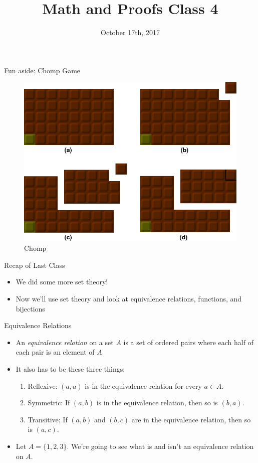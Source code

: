 \documentclass{beamer}
\begin{document}
\title[Math and Proofs]{Math and Proofs Class 4}
\date{October 17th, 2017}

\begin{frame}[plain]
\titlepage
\end{frame}

\begin{frame}{Fun aside: Chomp Game}
\begin{figure}
\includegraphics[scale=0.5]{Chomp.png}
\caption{Chomp}
\end{figure}
\end{frame}

\begin{frame}{Recap of Last Class}
\begin{itemize}
\item We did some more set theory!
\item Now we'll use set theory and look at equivalence relations, functions, and bijections
\end{itemize}
\end{frame}

\begin{frame}{Equivalence Relations}
\begin{itemize}
\item An \emph{equivalence relation} on a set $A$ is a set of ordered pairs where each half of each pair is an element of $A$
\item It also has to be these three things:
\begin{enumerate}
\item Reflexive: $(a,a)$ is in the equivalence relation for every $a\in A$.
\item Symmetric: If $(a,b)$ is in the equivalence relation, then so is $(b,a)$.
\item Transitive: If $(a,b)$ and $(b,c)$ are in the equivalence relation, then so is $(a,c)$.
\end{enumerate}
\item Let $A = \{1,2,3\}$. We're going to see what is and isn't an equivalence relation on $A$.
\end{itemize}
\end{frame}
\end{document}
